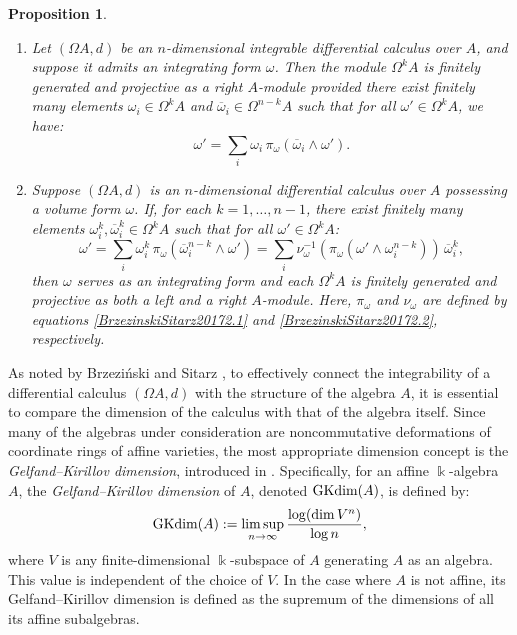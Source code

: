 \documentclass{amsart}
\newtheorem{proposition}[theorem]{Proposition}
\theoremstyle{definition}
\theoremstyle{remark}
\numberwithin{equation}{section}
\begin{document}
\begin{proposition}\label{BrzezinskiSitarz2017Lemmas2.6and2.7}
\begin{enumerate}
\item [\rm (1)] {\rm \cite[Lemma 2.6]{BrzezinskiSitarz2017}} Let $(\Omega A, d)$ be an $n$-dimensional integrable differential calculus over $A$, and suppose it admits an integrating form $\omega$. Then the module $\Omega^k A$ is finitely generated and projective as a right $A$-module provided there exist finitely many elements $\omega_i \in \Omega^k A$ and $\overline{\omega}_i \in \Omega^{n-k} A$ such that for all $\omega' \in \Omega^k A$, we have:
\[
\omega' = \sum_i \omega_i\, \pi_\omega(\overline{\omega}_i \wedge \omega').
\]
    
\item [\rm (2)] {\rm \cite[Lemma 2.7]{BrzezinskiSitarz2017}} Suppose $(\Omega A, d)$ is an $n$-dimensional differential calculus over $A$ possessing a volume form $\omega$. If, for each $k = 1, \ldots, n-1$, there exist finitely many elements $\omega_i^k, \overline{\omega}_i^k \in \Omega^k A$ such that for all $\omega' \in \Omega^k A$:
\[
\omega' = \sum_i \omega_i^k\, \pi_\omega(\overline{\omega}_i^{n-k} \wedge \omega') = \sum_i \nu_\omega^{-1}(\pi_\omega(\omega' \wedge \omega_i^{n-k}))\, \overline{\omega}_i^k,
\]
then $\omega$ serves as an integrating form and each $\Omega^k A$ is finitely generated and projective as both a left and a right $A$-module. Here, $\pi_\omega$ and $\nu_\omega$ are defined by equations \eqref{BrzezinskiSitarz20172.1} and \eqref{BrzezinskiSitarz20172.2}, respectively.
\end{enumerate}
\end{proposition}

As noted by Brzeziński and Sitarz \cite[p.~421]{BrzezinskiSitarz2017}, to effectively connect the integrability of a differential calculus $(\Omega A, d)$ with the structure of the algebra $A$, it is essential to compare the dimension of the calculus with that of the algebra itself. Since many of the algebras under consideration are noncommutative deformations of coordinate rings of affine varieties, the most appropriate dimension concept is the {\em Gelfand–Kirillov dimension}, introduced in \cite{GelfandKirillov1966, GelfandKirillov1966b}. Specifically, for an affine $\Bbbk$-algebra $A$, the {\em Gelfand–Kirillov dimension} of $A$, denoted ${\rm GKdim}(A)$, is defined by:
\[
{\rm GKdim}(A) := \limsup_{n \to \infty} \frac{\log(\dim V^n)}{\log n},
\]
where $V$ is any finite-dimensional $\Bbbk$-subspace of $A$ generating $A$ as an algebra. This value is independent of the choice of $V$. In the case where $A$ is not affine, its Gelfand–Kirillov dimension is defined as the supremum of the dimensions of all its affine subalgebras.
\end{document}
